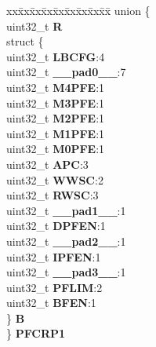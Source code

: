 \begin{DoxyCompactItemize}
\begin{tabbing}
\end{tabbing}\item 
\mbox{\label{structFLASH__tag_a8552ec347757ce2a03690f78276b7381}} 
\begin{tabbing}
xx\=xx\=xx\=xx\=xx\=xx\=xx\=xx\=xx\=\kill
union \{\\
\>uint32\_t {\bfseries R}\\
\>struct \{\\
\>\>uint32\_t {\bfseries LBCFG}:4\\
\>\>uint32\_t {\bfseries \_\_pad0\_\_}:7\\
\>\>uint32\_t {\bfseries M4PFE}:1\\
\>\>uint32\_t {\bfseries M3PFE}:1\\
\>\>uint32\_t {\bfseries M2PFE}:1\\
\>\>uint32\_t {\bfseries M1PFE}:1\\
\>\>uint32\_t {\bfseries M0PFE}:1\\
\>\>uint32\_t {\bfseries APC}:3\\
\>\>uint32\_t {\bfseries WWSC}:2\\
\>\>uint32\_t {\bfseries RWSC}:3\\
\>\>uint32\_t {\bfseries \_\_pad1\_\_}:1\\
\>\>uint32\_t {\bfseries DPFEN}:1\\
\>\>uint32\_t {\bfseries \_\_pad2\_\_}:1\\
\>\>uint32\_t {\bfseries IPFEN}:1\\
\>\>uint32\_t {\bfseries \_\_pad3\_\_}:1\\
\>\>uint32\_t {\bfseries PFLIM}:2\\
\>\>uint32\_t {\bfseries BFEN}:1\\
\>\} {\bfseries B}\\
\} {\bfseries PFCRP1}\\


\end{tabbing}
\end{DoxyCompactItemize}
